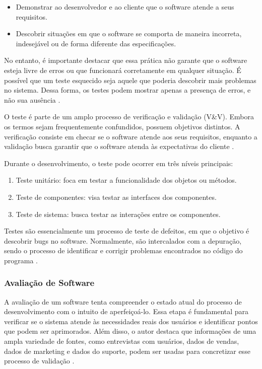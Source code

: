 \begin{itemize}
    \item Demonstrar ao desenvolvedor e ao cliente que o software atende a seus requisitos.
    \item Descobrir situações em que o software se comporta de maneira incorreta, indesejável ou de forma diferente das especiﬁcações.
\end{itemize}

No entanto, é importante destacar que essa prática não garante que o software esteja livre de erros ou que funcionará corretamente em qualquer situação. É possível que um teste esquecido seja aquele que poderia descobrir mais problemas no sistema. Dessa forma, os testes podem mostrar apenas a presença de erros, e não sua ausência \cite{sommerville2011engenharia}.

O teste é parte de um amplo processo de verificação e validação (V\&V). Embora os termos sejam frequentemente confundidos, possuem objetivos distintos. A verificação consiste em checar se o software atende aos seus requisitos, enquanto a validação busca garantir que o software atenda às expectativas do cliente \cite{sommerville2011engenharia}.

Durante o desenvolvimento, o teste pode ocorrer em três níveis principais:
\begin{enumerate}
    \item Teste unitário: foca em testar a funcionalidade dos objetos ou métodos.
    \item Teste de componentes: visa testar as interfaces dos componentes.
    \item Teste de sistema: busca testar as interações entre os componentes.
\end{enumerate}

Testes são essencialmente um processo de teste de defeitos, em que o objetivo é descobrir bugs no software. Normalmente, são intercalados com a depuração, sendo o processo de identificar e corrigir problemas encontrados no código do programa \cite{sommerville2011engenharia}.

\subsubsection{Avaliação de Software}

A avaliação de um software tenta compreender o estado atual do processo de desenvolvimento com o intuito de aperfeiçoá-lo. Essa etapa é fundamental para verificar se o sistema atende às necessidades reais dos usuários e identificar pontos que podem ser aprimorados. Além disso, o autor destaca que informações de uma ampla variedade de fontes, como entrevistas com usuários, dados de vendas, dados de marketing e dados do suporte, podem ser usadas para concretizar esse processo de validação \cite{pressman2016engenharia}.